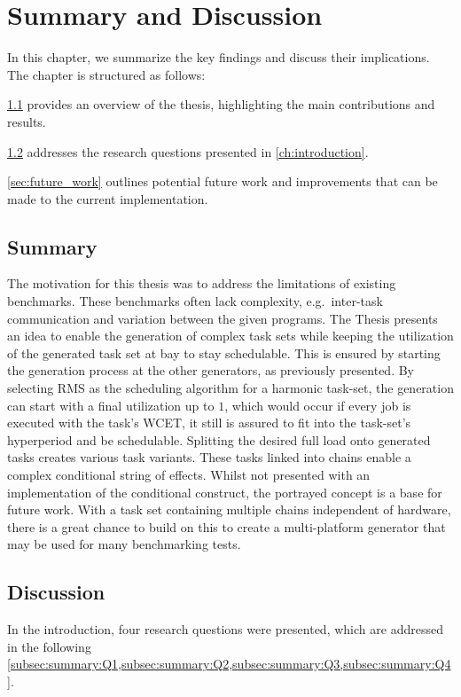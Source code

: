 \chapter{Summary and Discussion}\label{ch:summary_discussion}
In this chapter, we summarize the key findings and discuss their implications. The chapter is structured as follows:

\cref{sec:summary} provides an overview of the thesis, highlighting the main contributions and results.

\cref{sec:discussion} addresses the research questions presented in \cref{ch:introduction}.

\cref{sec:future_work} outlines potential future work and improvements that can be made to the current implementation.

\section{Summary}\label{sec:summary}
The motivation for this thesis was to address the limitations of existing benchmarks.
These benchmarks often lack complexity, e.g.~inter-task communication and variation between the given programs.
The Thesis presents an idea to enable the generation of complex task sets while keeping the utilization of the generated task set at bay to stay schedulable.
This is ensured by starting the generation process at the other generators, as previously presented.
By selecting \ac{RMS} as the scheduling algorithm for a harmonic task-set, the generation can start with a final utilization up to $1$, which would occur if every job is executed with the task's \ac{WCET}, it still is assured to fit into the task-set's hyperperiod and be schedulable.
Splitting the desired full load onto generated tasks creates various task variants.
These tasks linked into chains enable a complex conditional string of effects.
Whilst not presented with an implementation of the conditional construct, the portrayed concept is a base for future work.
With a task set containing multiple chains independent of hardware, there is a great chance to build on this to create a multi-platform generator that may be used for many benchmarking tests.

\section{Discussion}\label{sec:discussion}
In the introduction, four research questions were presented, which are addressed in the following \cref{subsec:summary:Q1,subsec:summary:Q2,subsec:summary:Q3,subsec:summary:Q4}.

